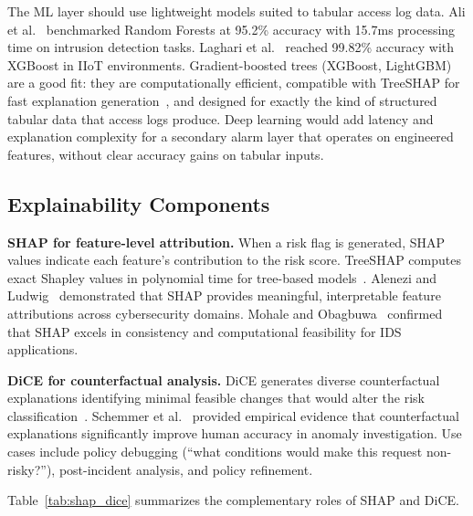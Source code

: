 \documentclass[conference]{IEEEtran}
\begin{document}
The ML layer should use lightweight models suited to tabular access log data. Ali et al.~\cite{ali2024} benchmarked Random Forests at 95.2\% accuracy with 15.7ms processing time on intrusion detection tasks. Laghari et al.~\cite{laghari2025} reached 99.82\% accuracy with XGBoost in IIoT environments. Gradient-boosted trees (XGBoost, LightGBM) are a good fit: they are computationally efficient, compatible with TreeSHAP for fast explanation generation~\cite{lundberg2017}, and designed for exactly the kind of structured tabular data that access logs produce. Deep learning would add latency and explanation complexity for a secondary alarm layer that operates on engineered features, without clear accuracy gains on tabular inputs.

\subsection{Explainability Components}

\textbf{SHAP for feature-level attribution.} When a risk flag is generated, SHAP values indicate each feature's contribution to the risk score. TreeSHAP computes exact Shapley values in polynomial time for tree-based models~\cite{lundberg2017}. Alenezi and Ludwig~\cite{alenezi2021} demonstrated that SHAP provides meaningful, interpretable feature attributions across cybersecurity domains. Mohale and Obagbuwa~\cite{mohale2025} confirmed that SHAP excels in consistency and computational feasibility for IDS applications.

\textbf{DiCE for counterfactual analysis.} DiCE generates diverse counterfactual explanations identifying minimal feasible changes that would alter the risk classification~\cite{mothilal2020}. Schemmer et al.~\cite{schemmer2023} provided empirical evidence that counterfactual explanations significantly improve human accuracy in anomaly investigation. Use cases include policy debugging (``what conditions would make this request non-risky?''), post-incident analysis, and policy refinement.

Table~\ref{tab:shap_dice} summarizes the complementary roles of SHAP and DiCE.
\end{document}
